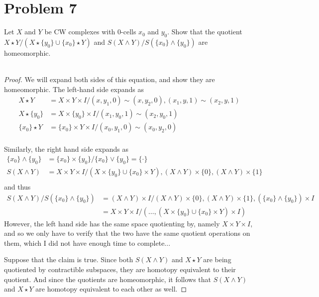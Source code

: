 \documentclass[fontsize=11pt]{scrartcl} %
\numberwithin{equation}{section} %
\numberwithin{figure}{section} %
\numberwithin{table}{section} %
\begin{document}
\section*{Problem 7}
Let $X$ and $Y$ be CW complexes with $0$-cells $x_0$ and $y_0$. Show that the
quotient $X\star Y/(X\star\{y_0\}\cup \{x_0\}\star Y)$ and $S(X\wedge
Y)/S(\{x_0\}\wedge \{y_0\})$ are homeomorphic.
\\
\\
\begin{proof}
    We will expand both sides of this equation, and show they are homeomorphic.
    The left-hand side expands as
    \[
        \begin{aligned}
            X\star Y &= X\times Y\times I/{(x,y_1,0)\sim
            (x,y_2,0),(x_1,y,1)\sim(x_2,y,1)}\\
            X\star \{y_0\} &= X\times \{y_0\}\times I/{(x_1,y_0,1)\sim
            (x_2,y_0,1)}\\
            \{x_0\}\star Y &= \{x_0\}\times Y\times I/{(x_0,y_1,0)
            \sim(x_0,y_2,0)}\\
        \end{aligned}
    \]

    Similarly, the right hand side expands as
    \[
        \begin{aligned}
            \{x_0\}\wedge \{y_0\} &= \{x_0\}\times \{y_0\}/\{x_0\}\vee\{y_0\}
            =\{\cdot\}\\
            S(X\wedge Y) &= X\times Y\times I/{(X\times\{y_0\}\cup
            \{x_0\}\times Y),(X\wedge Y)\times \{0\},(X\wedge Y)\times \{1\}}\\
        \end{aligned}
    \]
    and thus
    \[
        \begin{aligned}
            S(X\wedge Y)/{S(\{x_0\}\wedge\{y_0\})} &= (X\wedge Y)\times
            I/{(X\wedge Y)\times \{0\},(X\wedge Y)\times \{1\}, (\{x_0\}\wedge
            \{y_0\})\times I}\\
            &= X\times Y\times I/{(\ldots, (X\times \{y_0\}\cup \{x_0\}\times
            Y)\times I)}
        \end{aligned}
    \]
    However, the left hand side has the same space quotienting by, namely
    $X\times Y\times I$, and so we only have to verify that the two have the
    same quotient operations on them, which I did not have enough time to
    complete...

    Suppose that the claim is true. Since both $S(X\wedge Y)$ and $X\star Y$ are
    being quotiented by contractible subspaces, they are homotopy equivalent to their
    quotient. And since the quotients are homeomorphic, it follows that
    $S(X\wedge Y)$ and $X\star Y$ are homotopy equivalent to each other as well.

\end{proof}
\end{document}
